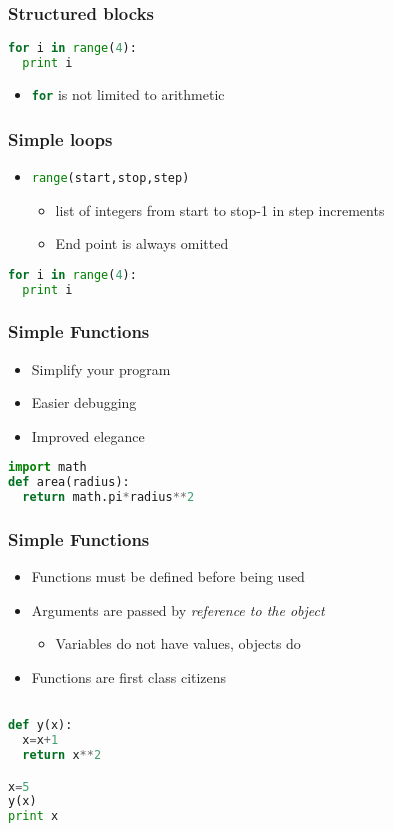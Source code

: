 \documentclass[xcolor=table,10pt,final]{beamer}
\begin{document}
\begin{frame}[fragile]
  \frametitle{Structured blocks}
  \begin{lstlisting}[language=Python]
for i in range(4):
  print i
\end{lstlisting}
\begin{itemize}
  \item \lstinline[language=Python]|for| is not limited to arithmetic
\end{itemize}
\end{frame}

\begin{frame}[fragile]
  \frametitle{Simple loops}
  \begin{itemize}
    \item \lstinline[language=Python]|range(start,stop,step)|
      \begin{itemize}
        \item list of integers from start to stop-1 in step increments
        \item End point is always omitted
      \end{itemize}
  \end{itemize}
\begin{lstlisting}[language=Python]
for i in range(4):
  print i
\end{lstlisting}
\end{frame}

\begin{frame}[fragile]
  \frametitle{Simple Functions}
  \begin{itemize}
    \item Simplify your program
    \item Easier debugging
    \item Improved elegance
  \end{itemize}
\begin{lstlisting}[language=Python]
import math
def area(radius):
  return math.pi*radius**2
\end{lstlisting}
\end{frame}

\begin{frame}[fragile]
  \frametitle{Simple Functions}
  \begin{itemize}
    \item Functions must be defined before being used
    \item Arguments are passed by {\it reference to the object}\footnotemark
      \begin{itemize}
        \item Variables do not have values, objects do
      \end{itemize}
    \item Functions are first class citizens
  \end{itemize}
\begin{lstlisting}[language=Python]

def y(x):
  x=x+1
  return x**2

x=5
y(x)
print x
\end{lstlisting}
{\tiny {}}
\end{frame}
\end{document}
